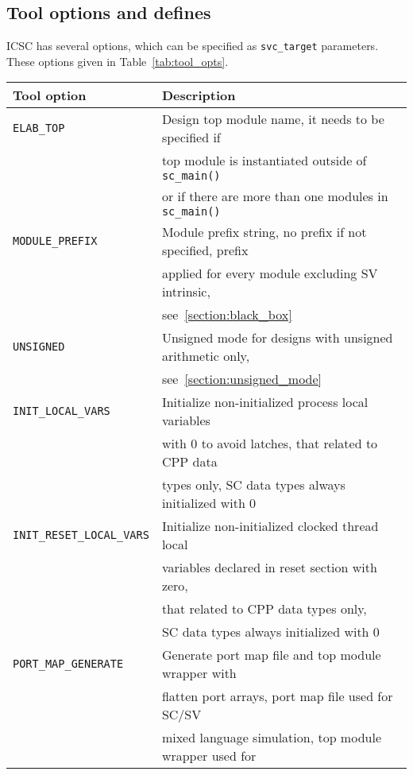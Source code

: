 
\subsection{Tool options and defines}\label{section:tool_options}

ICSC has several options, which can be specified as {\tt svc\_target} parameters. These options given in Table~\ref{tab:tool_opts}.


\begin{table}
\begin{tabular}{|l|l|}
\hline
Tool option & Description \\
\hline
{\tt ELAB\_TOP} & Design top module name, it needs to be specified if \\
                & top module is instantiated outside of {\tt sc\_main()} \\
                & or if there are more than one modules in {\tt sc\_main()} \\
{\tt MODULE\_PREFIX} &  Module prefix string, no prefix if not specified, prefix \\         
                & applied for every module excluding SV intrinsic, \\
                & see~\ref{section:black_box} \\
{\tt UNSIGNED}  & Unsigned mode for designs with unsigned arithmetic only, \\
                & see~\ref{section:unsigned_mode} \\
{\tt INIT\_LOCAL\_VARS} & Initialize non-initialized process local variables \\
                & with 0 to avoid latches, that related to CPP data \\
                & types only, SC data types always initialized with 0 \\
{\tt INIT\_RESET\_LOCAL\_VARS} & Initialize non-initialized clocked thread local \\
                & variables declared in reset section with zero, \\
                & that related to CPP data types only, \\
                & SC data types always initialized with 0 \\
{\tt PORT\_MAP\_GENERATE} & Generate port map file and top module wrapper with \\
                & flatten port arrays, port map file used for SC/SV \\
                & mixed language simulation, top module wrapper used for \\

\end{tabular}
\end{table}
